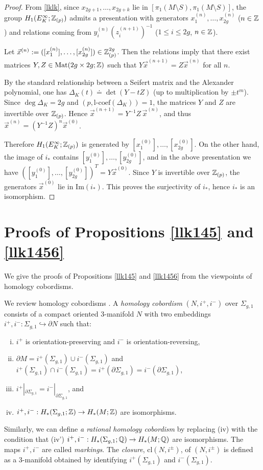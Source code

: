 \documentclass{article}
\theoremstyle{plain}
\theoremstyle{definition}
\def\det{\mathop{\mathrm{det}}\nolimits}
\newcommand{\ra}{\rightarrow}
\newcommand{\Q}{{\Bbb Q}}
\newcommand{\Z}{{\Bbb Z}}
\newcommand{\lc}{{\mathrm{l}\textrm{-}\mathrm{coef}}}
\begin{document}
{\begin{proof}
From \eqref{lklk}, since $x_{2g+1},\dots,x_{2g+k}$ lie in
$[\pi_1(M\setminus S),\pi_1(M\setminus S)]$, the group
$H_1(E_K^\infty;\Z_{(p)})$ admits a presentation with generators
$x_1^{(n)},\dots,x_{2g}^{(n)}$ ($n\in\Z$) and relations coming from
$y_i^{(n)}(z_i^{(n+1)})^{-1}$ ($1\le i\le 2g$, $n\in\Z$).

Let $\vec{x}^{(n)}:=([x_1^{(n)}],\dots,[x_{2g}^{(n)}])\in \Z_{(p)}^{2g}$.
Then the relations imply that there exist matrices $Y,Z\in\mathrm{Mat}(2g\times 2g;\Z)$ such that
$Y\vec{x}^{(n+1)}=Z\vec{x}^{(n)}$ for all $n$.

By the standard relationship between a Seifert matrix and the Alexander polynomial,
one has $\Delta_K(t)\doteq \det(Y-tZ)$ (up to multiplication by $\pm t^m$).
Since $\deg\Delta_K=2g$ and $(p,\lc(\Delta_K))=1$, the matrices $Y$ and $Z$
are invertible over $\Z_{(p)}$. Hence
$\vec{x}^{(n+1)}=Y^{-1}Z\,\vec{x}^{(n)}$, and thus $\vec{x}^{(n)}=(Y^{-1}Z)^n\vec{x}^{(0)}$.

Therefore $H_1(E_K^\infty;\Z_{(p)})$ is generated by $[x_1^{(0)}],\dots,[x_{2g}^{(0)}]$.
On the other hand, the image of $i_*$ contains $[y_1^{(0)}],\dots,[y_{2g}^{(0)}]$,
and in the above presentation we have $( [y_1^{(0)}],\dots,[y_{2g}^{(0)}])^T = Y\vec{x}^{(0)}$.
Since $Y$ is invertible over $\Z_{(p)}$, the generators $\vec{x}^{(0)}$ lie in $\mathrm{Im}(i_*)$.
This proves the surjectivity of $i_*$, hence $i_*$ is an isomorphism.
\end{proof}

\section{Proofs of Propositions \ref{llk145} and \ref{llk1456}}
\label{Ap3}

We give the proofs of Propositions \ref{llk145} and \ref{llk1456} from the viewpoints of homology cobordisms.

We review homology cobordisms \cite{GL}. %
A {\it homology cobordism} $(N,i^+, i^-)$ over $\Sigma_{g,1}$ consists of a compact
oriented 3-manifold $N$ with two embeddings $i^+, i^- : \Sigma_{g,1} \hookrightarrow \partial N$
such that:
\begin{enumerate}[(i)]
\item $i^+$ is orientation-preserving and $i^-$ is orientation-reversing,
\item $\partial M= i^+ (\Sigma_{g,1} ) \cup i^- (\Sigma_{g,1} ) $ and
$i^+ (\Sigma_{g,1} ) \cap i^- (\Sigma_{g,1} )=i^+ (\partial \Sigma_{g,1} ) = i^- (\partial \Sigma_{g,1} ) $,
\item $i^+ |_{\partial \Sigma_{g,1} } = i^- |_{\partial \Sigma_{g,1} }$, and
\item $i^+, i^- :H_*(\Sigma_{g,1};\Z) \ra H_*(M;\Z)$ are isomorphisms.
\end{enumerate}
Similarly, we can define {\it a rational homology cobordism} by replacing
(iv) with the condition that (iv') $i^+, i^-:H_*(\Sigma_{g,1};\Q) \ra H_*(M;\Q)$ are
isomorphisms. The maps $i^+, i^- $ are called {\it markings}.
The {\it closure}, $\mathrm{cl}(N,i^{\pm} )$, of $(N,i^{\pm} ) $ is defined as
a 3-manifold obtained by identifying $i^+(\Sigma_{g,1} ) $ and $i^- (\Sigma_{g,1} ) $.

}
\end{document}
